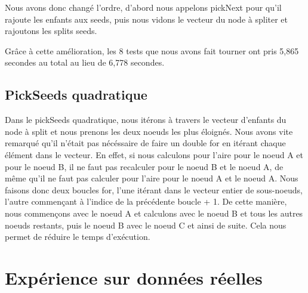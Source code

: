 \documentclass[utf8]{article}
\begin{document}
\begin{large}
  Nous avons donc changé l'ordre, d'abord nous appelons pickNext pour qu'il
  rajoute les enfants aux seeds, puis nous vidons le vecteur du node à spliter et
  rajoutons les splits seeds.

  Grâce à cette amélioration, les 8 tests que nous avons fait tourner ont pris
  5,865 secondes au total au lieu de 6,778 secondes.
  \par
  \subsection{PickSeeds quadratique}
  \par
  \indent
  Dans le pickSeeds quadratique, nous itérons à travers le vecteur d'enfants du node à
  split et nous prenons les deux noeuds les plus éloignés. Nous avons vite
  remarqué qu'il n'était pas nécéssaire de faire un double for en itérant chaque
  élément dans le vecteur. En effet, si nous calculons pour l'aire pour le noeud A
  et pour le noeud B, il ne faut pas recalculer pour le noeud B et le noeud A, de
  même qu'il ne faut pas calculer pour l'aire pour le noeud A et le noeud A. Nous
  faisons donc deux boucles for, l'une itérant dans le vecteur entier de
  sous-noeuds, l'autre commençant à l'indice de la précédente boucle + 1. De cette
  manière, nous commençons avec le noeud A et calculons avec le noeud B et tous
  les autres noeuds restants, puis le noeud B avec le noeud C et ainsi de suite.
  Cela nous permet de réduire le temps d'exécution.
  \par


  \section{Expérience sur données réelles}

\end{large}
\end{document}
